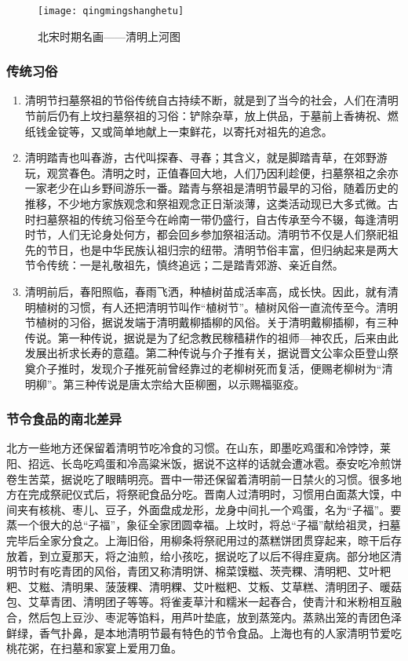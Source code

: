 \begin{figure}
    \centering
    \texttt{[image: qingmingshanghetu]}
    \caption{北宋时期名画——清明上河图}
\end{figure}
\subsubsection{传统习俗}
\begin{enumerate}
\item 
清明节扫墓祭祖的节俗传统自古持续不断，就是到了当今的社会，人们在清明节前后仍有上坟扫墓祭祖的习俗：铲除杂草，放上供品，于墓前上香祷祝、燃纸钱金锭等，又或简单地献上一束鲜花，以寄托对祖先的追念。
\item 
清明踏青也叫春游，古代叫探春、寻春；其含义，就是脚踏青草，在郊野游玩，观赏春色。清明之时，正值春回大地，人们乃因利趁便，扫墓祭祖之余亦一家老少在山乡野间游乐一番。踏青与祭祖是清明节最早的习俗，随着历史的推移，不少地方家族观念和祭祖观念正日渐淡薄，这类活动现已大多式微。古时扫墓祭祖的传统习俗至今在岭南一带仍盛行，自古传承至今不辍，每逢清明时节，人们无论身处何方，都会回乡参加祭祖活动。清明节不仅是人们祭祀祖先的节日，也是中华民族认祖归宗的纽带。清明节俗丰富，但归纳起来是两大节令传统：一是礼敬祖先，慎终追远；二是踏青郊游、亲近自然。
\item 
清明前后，春阳照临，春雨飞洒，种植树苗成活率高，成长快。因此，就有清明植树的习惯，有人还把清明节叫作“植树节”。植树风俗一直流传至今。清明节植树的习俗，据说发端于清明戴柳插柳的风俗。关于清明戴柳插柳，有三种传说。第一种传说，据说是为了纪念教民稼穑耕作的祖师—神农氏，后来由此发展出祈求长寿的意蕴。第二种传说与介子推有关，据说晋文公率众臣登山祭奠介子推时，发现介子推死前曾经靠过的老柳树死而复活，便赐老柳树为“清明柳”。第三种传说是唐太宗给大臣柳圈，以示赐福驱疫。    
\end{enumerate}

\subsubsection{节令食品的南北差异}
北方一些地方还保留着清明节吃冷食的习惯。在山东，即墨吃鸡蛋和冷饽饽，莱阳、招远、长岛吃鸡蛋和冷高粱米饭，据说不这样的话就会遭冰雹。泰安吃冷煎饼卷生苦菜，据说吃了眼睛明亮。晋中一带还保留着清明前一日禁火的习惯。很多地方在完成祭祀仪式后，将祭祀食品分吃。晋南人过清明时，习惯用白面蒸大馍，中间夹有核桃、枣儿、豆子，外面盘成龙形，龙身中间扎一个鸡蛋，名为“子福”。要蒸一个很大的总“子福”，象征全家团圆幸福。上坟时，将总“子福”献给祖灵，扫墓完毕后全家分食之。上海旧俗，用柳条将祭祀用过的蒸糕饼团贯穿起来，晾干后存放着，到立夏那天，将之油煎，给小孩吃，据说吃了以后不得疰夏病。部分地区清明节时有吃青团的风俗，青团又称清明饼、棉菜馍糍、茨壳粿、清明粑、艾叶粑粑、艾糍、清明果、菠菠粿、清明粿、艾叶糍粑、艾粄、艾草糕、清明团子、暖菇包、艾草青团、清明团子等等。将雀麦草汁和糯米一起舂合，使青汁和米粉相互融合，然后包上豆沙、枣泥等馅料，用芦叶垫底，放到蒸笼内。蒸熟出笼的青团色泽鲜绿，香气扑鼻，是本地清明节最有特色的节令食品。上海也有的人家清明节爱吃桃花粥，在扫墓和家宴上爱用刀鱼。


